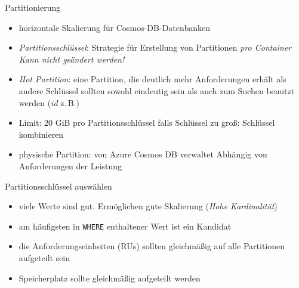\begin{flashcard}[Definition]{Partitionierung}
    \begin{itemize}
        \item horizontale Skalierung für Cosmos-DB-Datenbanken
        \item \emph{Partitionsschlüssel}: Strategie für Erstellung von Partitionen \emph{pro Container}\newline
            \emph{Kann nicht geändert werden!}
        \item \emph{Hot Partition}: eine Partition, die deutlich mehr Anforderungen erhält als andere\newline
            Schlüssel sollten sowohl eindeutig sein als auch zum Suchen benutzt werden (\emph{id} z.\,B.)
        \item Limit: 20 GiB pro Partitionsschlüssel\newline
            falls Schlüssel zu groß: Schlüssel kombinieren
        \item physische Partition: von Azure Cosmos DB verwaltet \newline
            Abhängig von Anforderungen der Leistung
    \end{itemize}
\end{flashcard}

\begin{flashcard}[Definition]{Partitionsschlüssel auswählen}
    \begin{itemize}
        \item viele Werte sind gut. Ermöglichen gute Skalierung (\emph{Hohe Kardinalität})
        \item am häufigsten in \texttt{WHERE} enthaltener Wert ist ein Kandidat
        \item die Anforderungseinheiten (RUs) sollten gleichmäßig auf alle Partitionen aufgeteilt sein
        \item Speicherplatz sollte gleichmäßig aufgeteilt werden
    \end{itemize}
\end{flashcard}


